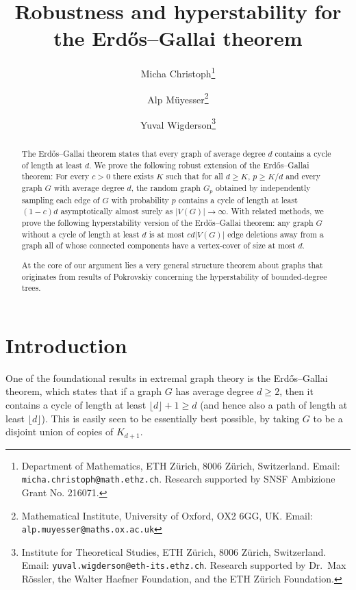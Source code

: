 \documentclass[10pt]{article}
\title{Robustness and hyperstability for the Erd\H{o}s--Gallai theorem}
\author{Micha Christoph\thanks{Department of Mathematics, ETH Z\"{u}rich, 8006 Z\"urich, Switzerland. Email: \texttt{micha.christoph@math.ethz.ch}. Research supported by SNSF Ambizione Grant No. 216071.}\and Alp M\"uyesser\thanks{Mathematical Institute, University of Oxford, OX2 6GG, UK. Email: \texttt{alp.muyesser@maths.ox.ac.uk}} \and Yuval Wigderson\thanks{Institute for Theoretical Studies, ETH Z\"urich, 8006 Z\"urich, Switzerland. Email: \texttt{yuval.wigderson@eth-its.ethz.ch}. Research supported by Dr.\ Max R\"ossler, the Walter Haefner Foundation, and the ETH Z\"urich Foundation.}}
\date{}
\theoremstyle{definition}
\let\geq\geqslant
\begin{document}
\maketitle
\begin{abstract}
    The Erd\H{o}s--Gallai theorem states that every graph of average degree $d$ contains a cycle of length at least $d$. We prove the following robust extension of the Erd\H{o}s--Gallai theorem: For every $c>0$ there exists $K$ such that for all $d\geq K$, $p\geq K/d$ and every graph $G$ with average degree $d$, the random graph $G_p$ obtained by independently sampling each edge of $G$ with probability $p$ contains a cycle of length at least $(1-c)d$ asymptotically almost surely as $|V(G)|\to \infty$. 
    With related methods, we prove the following hyperstability version of the Erd\H{o}s--Gallai theorem: any graph $G$ without a cycle of length at least $d$ is at most $c d|V(G)|$ edge deletions away from a graph all of whose connected components have a vertex-cover of size at most $d$.
    \par At the core of our argument lies a very general structure theorem about graphs that originates from results of Pokrovskiy concerning the hyperstability of bounded-degree trees. 
\end{abstract}
\section{Introduction}

One of the foundational results in extremal graph theory is the Erd\H os--Gallai \cite{MR114772} theorem, which states that if a graph $G$ has average degree $d\geq 2$, then it contains a cycle of length at least $\lfloor d \rfloor+1\geq d$ (and hence also a path of length at least $\lfloor d \rfloor$). This is easily seen to be essentially best possible, by taking $G$ to be a disjoint union of copies of $K_{d+1}$. 
\end{document}
